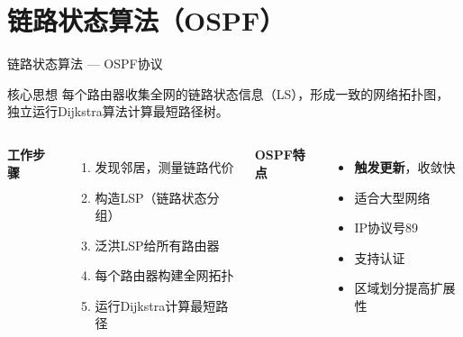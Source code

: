 \documentclass[10pt, aspectratio=169]{beamer}
\begin{document}
\section{链路状态算法（OSPF）}
\begin{frame}{链路状态算法 --- OSPF协议}
    \begin{block}{核心思想}
        每个路由器收集全网的链路状态信息（LS），形成一致的网络拓扑图，独立运行Dijkstra算法计算最短路径树。
    \end{block}
    \vspace{0.3em}
    \begin{columns}[t]
        \textbf{工作步骤}
        \begin{enumerate}
            \item 发现邻居，测量链路代价
            \item 构造LSP（链路状态分组）
            \item 泛洪LSP给所有路由器
            \item 每个路由器构建全网拓扑
            \item 运行Dijkstra计算最短路径
        \end{enumerate}
        \textbf{OSPF特点}
        \begin{itemize}
            \item \textbf{触发更新}，收敛快
            \item 适合大型网络
            \item IP协议号89
            \item 支持认证
            \item 区域划分提高扩展性
        \end{itemize}
    \end{columns}
\end{frame}
\end{document}
